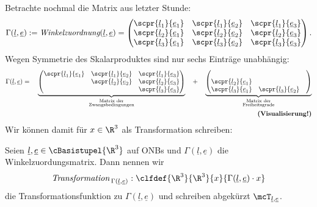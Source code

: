 \documentclass[../WiSe22ANA3.tex]{subfiles}
\begin{document}
		Betrachte nochmal die Matrix aus letzter Stunde:
		\begin{align*}
			\Gamma(\underline l,\underline e):=\textit{Winkelzuordnung}(\underline l,\underline e)=
			\begin{pmatrix}
				\scpr{\underline l_1}{\underline e_1} & \scpr{\underline l_1}{\underline e_2} & \scpr{\underline l_1}{\underline e_3} \\
				\scpr{\underline l_2}{\underline e_1} & \scpr{\underline l_2}{\underline e_2} & \scpr{\underline l_2}{\underline e_3} \\
				\scpr{\underline l_3}{\underline e_1} & \scpr{\underline l_3}{\underline e_2} & 
				\scpr{\underline l_3}{\underline e_3}
			\end{pmatrix}. 
		\end{align*}
		Wegen Symmetrie des Skalarproduktes sind nur sechs Einträge unabhängig:
		\begin{align*}
			\Gamma(\underline l,\underline e)=\quad\underbrace{\begin{pmatrix}
				\scpr{\underline l_1}{\underline e_1} & \scpr{\underline l_1}{\underline e_2} & \scpr{\underline l_1}{\underline e_3} \\
				 & \scpr{\underline l_2}{\underline e_2} & \scpr{\underline l_2}{\underline e_3} \\
				 & & 
				\scpr{\underline l_3}{\underline e_3}
			\end{pmatrix}}_{\substack{\text{Matrix der}\\\text{Zwangsbedingungen}}} \quad+\quad\underbrace{\begin{pmatrix}
				 & & \\
				\scpr{\underline l_2}{\underline e_1} & & \\
				\scpr{\underline l_3}{\underline e_1} & \scpr{\underline l_3}{\underline e_2} & 
			\end{pmatrix}}_{\substack{\text{Matrix der}\\\text{Freiheitsgrade}}} \\
			\textbf{(Visualisierung!)}
		\end{align*}
		Wir können damit für $x\in\R^3$ als Transformation schreiben:
		\begin{info}[Koordinatentransformationsfunktion]
			Seien $\underline l,\underline e\in\cBasistupel{\R^3}$ auf ONBs und $\Gamma(\underline l,\underline e)$ die Winkelzuordungsmatrix. Dann nennen wir 
			$$\textit{Transformation\,}_{\Gamma(\underline l,\underline e)}:\clfdef{\R^3}{\R^3}{x}{\Gamma(\underline l,\underline e)\cdot x}$$
			die Transformationsfunktion zu $\Gamma(\underline l,\underline e)$ und schreiben abgekürzt $\mcT_{\underline l,\underline e}$. 
		\end{info}
\end{document}
